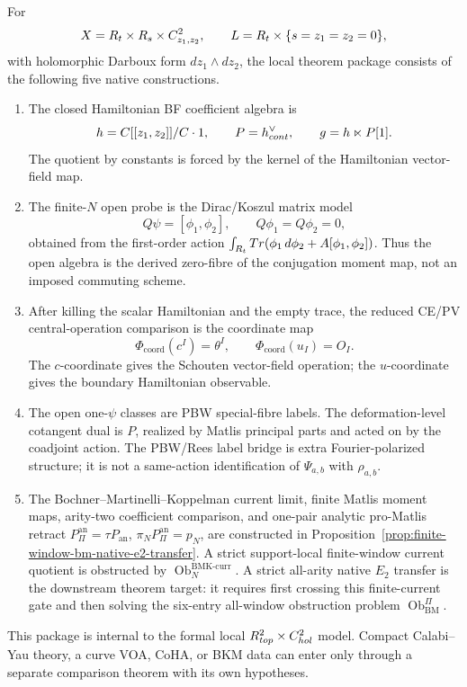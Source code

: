 \documentclass[11pt]{memoir}
\begin{document}
\begin{prop}\label{prop:native-darboux-theorem-package}
  For
  \[
    X=R_t\times R_s\times C^2_{z_1,z_2},\qquad
    L=R_t\times\{s=z_1=z_2=0\},
  \]
  with holomorphic Darboux form \(dz_1\wedge dz_2\), the local theorem
  package consists of the following five native constructions.
  \begin{enumerate}
    \item The closed Hamiltonian BF coefficient algebra is
      \[
        h=C[[z_1,z_2]]/C\cdot1,\qquad
        P=h^\vee_{cont},\qquad
        g=h\ltimes P[1].
      \]
      The quotient by constants is forced by the kernel of the Hamiltonian
      vector-field map.
    \item The finite-\(N\) open probe is the Dirac/Koszul matrix model
      \[
        Q\psi=[\phi_1,\phi_2],\qquad Q\phi_1=Q\phi_2=0,
      \]
      obtained from the first-order action
      \(\int_{R_t}Tr(\phi_1\,d\phi_2
      +A[\phi_1,\phi_2])\).  Thus the open algebra is the derived
      zero-fibre of the conjugation moment map, not an imposed commuting
      scheme.
    \item After killing the scalar Hamiltonian and the empty trace, the
      reduced CE/PV central-operation comparison is the coordinate map
      \[
        \Phi_{\mathrm{coord}}(c^I)=\theta^I,\qquad
        \Phi_{\mathrm{coord}}(u_I)=O_I .
      \]
      The \(c\)-coordinate gives the Schouten vector-field operation; the
      \(u\)-coordinate gives the boundary Hamiltonian observable.
    \item The open one-\(\psi\) classes are PBW special-fibre labels.
      The deformation-level cotangent dual is \(P\), realized by Matlis
      principal parts and acted on by the coadjoint action.  The
      PBW/Rees label bridge is extra Fourier-polarized structure; it is
      not a same-action identification of \(\Psi_{a,b}\) with
      \(\rho_{a,b}\).
    \item The Bochner--Martinelli--Koppelman current limit, finite
      Matlis moment maps, arity-two coefficient comparison, and
      one-pair analytic pro-Matlis retract
      \(P_{\Pi}^{\mathrm{an}}=\tau P_{\mathrm{an}}\),
      \(\pi_NP_{\Pi}^{\mathrm{an}}=p_N\), are constructed in
      Proposition~\ref{prop:finite-window-bm-native-e2-transfer}.  A
      strict support-local finite-window current quotient is obstructed
      by \(\operatorname{Ob}^{\mathrm{BMK\mbox{-}curr}}_N\).  A strict
      all-arity native \(E_2\) transfer is the downstream theorem target:
      it requires first crossing this finite-current gate and then
      solving the six-entry all-window obstruction problem
      \(\operatorname{Ob}^{\Pi}_{\mathrm{BM}}\).
  \end{enumerate}
  This package is internal to the formal local
  \(R^2_{top}\times C^2_{hol}\) model.  Compact
  Calabi--Yau theory, a curve VOA, CoHA, or BKM data can enter only
  through a separate comparison theorem with its own hypotheses.
\end{prop}
\end{document}
